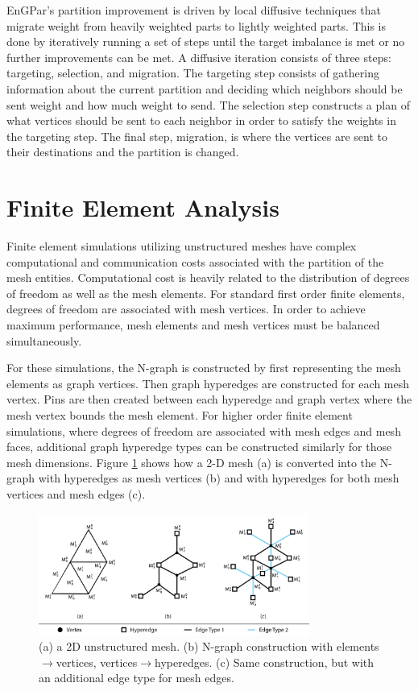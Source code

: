 \documentclass[conference]{IEEEtran}
\begin{document}
EnGPar's partition improvement is driven by local diffusive techniques that migrate weight
from heavily weighted parts to lightly weighted parts. This is done by iteratively running
a set of steps until the target imbalance is met or no further improvements can be met.
A diffusive iteration consists of three steps: targeting, selection, and migration.
The targeting step consists of gathering information about the current partition and deciding
which neighbors should be sent weight and how much weight to send. The selection step constructs
a plan of what vertices should be sent to each neighbor in order to satisfy the weights in
the targeting step. The final step, migration, is where the vertices are sent to their
destinations and the partition is changed.

\section{Finite Element Analysis}
Finite element simulations utilizing unstructured meshes have complex computational
and communication costs associated with the partition of the mesh entities. Computational
cost is heavily related to the distribution of degrees of freedom as well as the mesh
elements. For standard first order finite elements, degrees of freedom are associated
with mesh vertices. In order to achieve maximum performance, mesh elements and mesh
vertices must be balanced simultaneously.

For these simulations, the N-graph is constructed by first representing the mesh elements
as graph vertices. Then graph hyperedges are constructed for each mesh vertex. Pins
are then created between each hyperedge and graph vertex where the mesh vertex bounds the
mesh element. For higher order finite element simulations, where degrees of freedom are
associated with mesh edges and mesh faces, additional graph hyperedge types can be constructed
similarly for those mesh dimensions. Figure \ref{fig:mesh2graph} shows how a 2-D mesh (a)
is converted into the N-graph with hyperedges as mesh vertices (b) and with hyperedges for
both mesh vertices and mesh edges (c).

\begin{figure}[!ht]
  \centering
  \includegraphics[width=3.5in]{../figures/exampleMesh2Graph.png}
  \caption{(a) a 2D unstructured mesh. (b) N-graph construction with elements$\rightarrow$vertices, vertices$\rightarrow$hyperedges. (c) Same construction, but with an additional edge type for mesh edges.}
  \label{fig:mesh2graph}
\end{figure}
\end{document}
